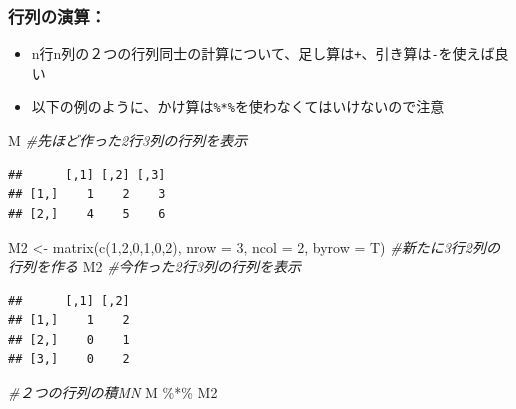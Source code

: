 \documentclass[
]{book}
\newenvironment{Shaded}{\begin{snugshade}}{\end{snugshade}}
\newcommand{\AttributeTok}[1]{\textcolor[rgb]{0.77,0.63,0.00}{#1}}
\newcommand{\CommentTok}[1]{\textcolor[rgb]{0.56,0.35,0.01}{\textit{#1}}}
\newcommand{\DecValTok}[1]{\textcolor[rgb]{0.00,0.00,0.81}{#1}}
\newcommand{\FunctionTok}[1]{\textcolor[rgb]{0.00,0.00,0.00}{#1}}
\newcommand{\NormalTok}[1]{#1}
\newcommand{\OtherTok}[1]{\textcolor[rgb]{0.56,0.35,0.01}{#1}}
\newcommand{\SpecialCharTok}[1]{\textcolor[rgb]{0.00,0.00,0.00}{#1}}
\providecommand{\tightlist}{%
  \setlength{\itemsep}{0pt}\setlength{\parskip}{0pt}}
\begin{document}
\hypertarget{ux884cux5217ux306eux6f14ux7b97}{%
\subsubsection*{行列の演算：}\label{ux884cux5217ux306eux6f14ux7b97}}

\begin{itemize}
\tightlist
\item
  n行n列の２つの行列同士の計算について、足し算は\texttt{+}、引き算は\texttt{-}を使えば良い
\item
  以下の例のように、かけ算は\texttt{\%*\%}を使わなくてはいけないので注意
\end{itemize}

\begin{Shaded}
\begin{Highlighting}[]
\NormalTok{M }\CommentTok{\#先ほど作った2行3列の行列を表示}
\end{Highlighting}
\end{Shaded}

\begin{verbatim}
##      [,1] [,2] [,3]
## [1,]    1    2    3
## [2,]    4    5    6
\end{verbatim}

\begin{Shaded}
\begin{Highlighting}[]
\NormalTok{M2 }\OtherTok{\textless{}{-}} \FunctionTok{matrix}\NormalTok{(}\FunctionTok{c}\NormalTok{(}\DecValTok{1}\NormalTok{,}\DecValTok{2}\NormalTok{,}\DecValTok{0}\NormalTok{,}\DecValTok{1}\NormalTok{,}\DecValTok{0}\NormalTok{,}\DecValTok{2}\NormalTok{), }\AttributeTok{nrow =} \DecValTok{3}\NormalTok{, }\AttributeTok{ncol =} \DecValTok{2}\NormalTok{, }\AttributeTok{byrow =}\NormalTok{ T) }\CommentTok{\#新たに3行2列の行列を作る}
\NormalTok{M2 }\CommentTok{\#今作った2行3列の行列を表示}
\end{Highlighting}
\end{Shaded}

\begin{verbatim}
##      [,1] [,2]
## [1,]    1    2
## [2,]    0    1
## [3,]    0    2
\end{verbatim}

\begin{Shaded}
\begin{Highlighting}[]
\CommentTok{\#２つの行列の積MN}
\NormalTok{M }\SpecialCharTok{\%*\%}\NormalTok{ M2 }
\end{Highlighting}
\end{Shaded}
\end{document}
